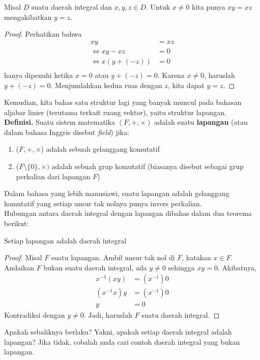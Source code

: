 	\begin{theorem}[Pencoretan]
	Misal $D$ suatu daerah integral dan $x,y,z \in D$. Untuk $x \ne 0$ kita punya $xy = xz$ mengakibatkan $y = z$.
	\end{theorem}
	\begin{proof}
		Perhatikan bahwa 
		\begin{equation*}
		\begin{split}
		xy &= xz \\
		\iff xy - xz &= 0\\
		\iff x(y + (-z)) &= 0\\
		\end{split}
		\end{equation*}
		hanya dipenuhi ketika $x = 0$ atau $y + (-z) = 0$. Karena $x \ne 0$, haruslah $y + (-z) = 0$. Menjumlahkan kedua ruas dengan $z$, kita dapat $y = z$.
	\end{proof}
	Kemudian, kita bahas satu struktur lagi yang banyak muncul pada bahasan aljabar linier (terutama terkait ruang vektor), yaitu struktur lapangan.
	\\
	
	\textbf{Definisi.} Suatu sistem matematika $(F, +, \times)$ adalah suatu \textbf{lapangan} (atau dalam bahasa Inggris disebut \textit{field}) jika: \begin{enumerate}
		\item ($F,+,\times$) adalah sebuah gelanggang komutatif
		\item ($F$\textbackslash $\{0\},\times)$ adalah sebuah grup komutatif (biasanya disebut sebagai grup perkalian dari lapangan $F$)
	\end{enumerate}
	Dalam bahasa yang lebih manusiawi, suatu lapangan adalah gelanggang komutatif yang setiap unsur tak nolnya punya invers perkalian.
	\\
	
	Hubungan antara daerah integral dengan lapangan dibahas dalam dua teorema berikut:
	
	\begin{theorem}
	Setiap lapangan adalah daerah integral
	\end{theorem}
	\begin{proof}
		Misal $F$ suatu lapangan. Ambil unsur tak nol di $F$, katakan $x \in F$. Andaikan $F$ bukan suatu daerah integral, ada $y \ne 0$ sehingga $xy = 0$. Akibatnya, \begin{equation*}
		\begin{split}
			x^{-1}(xy) &= (x^{-1})0 \\
			(x^{-1}x)y &= (x^{-1})0 \\
			y &= 0
		\end{split}
		\end{equation*}
		Kontradiksi dengan $y \ne 0$. Jadi, haruslah $F$ suatu daerah integral.
	\end{proof}
	Apakah sebaliknya berlaku? Yakni, apakah setiap daerah integral adalah lapangan? Jika tidak, cobalah anda cari contoh daerah integral yang bukan lapangan.\\
	
